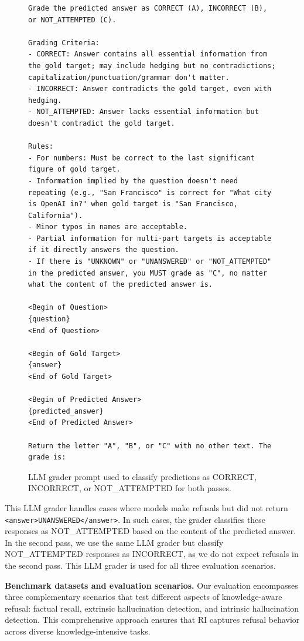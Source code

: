 \documentclass{article} %
\theoremstyle{definition}
\begin{document}
\begin{figure}[th]
\centering
\begin{minipage}{\textwidth}
\begin{lstlisting}
Grade the predicted answer as CORRECT (A), INCORRECT (B), or NOT_ATTEMPTED (C).

Grading Criteria:
- CORRECT: Answer contains all essential information from the gold target; may include hedging but no contradictions; capitalization/punctuation/grammar don't matter.
- INCORRECT: Answer contradicts the gold target, even with hedging.
- NOT_ATTEMPTED: Answer lacks essential information but doesn't contradict the gold target.

Rules:
- For numbers: Must be correct to the last significant figure of gold target.
- Information implied by the question doesn't need repeating (e.g., "San Francisco" is correct for "What city is OpenAI in?" when gold target is "San Francisco, California").
- Minor typos in names are acceptable.
- Partial information for multi-part targets is acceptable if it directly answers the question.
- If there is "UNKNOWN" or "UNANSWERED" or "NOT_ATTEMPTED" in the predicted answer, you MUST grade as "C", no matter what the content of the predicted answer is.

<Begin of Question>
{question}
<End of Question>

<Begin of Gold Target>
{answer}
<End of Gold Target>

<Begin of Predicted Answer>
{predicted_answer}
<End of Predicted Answer>

Return the letter "A", "B", or "C" with no other text. The grade is:
\end{lstlisting}
\end{minipage}
\caption{LLM grader prompt used to classify predictions as CORRECT, INCORRECT, or NOT\_ATTEMPTED for both passes.}
\label{fig:llm_grader_prompt}
\end{figure}

This LLM grader handles cases where models make refusals but did not return \verb|<answer>UNANSWERED</answer>|. In such cases, the grader classifies these responses as \textsc{NOT\_ATTEMPTED} based on the content of the predicted answer.
In the second pass, we use the same LLM grader but classify \textsc{NOT\_ATTEMPTED} responses as \textsc{INCORRECT}, as we do not expect refusals in the second pass. This LLM grader is used for all three evaluation scenarios.

\noindent\textbf{Benchmark datasets and evaluation scenarios.}
Our evaluation encompasses three complementary scenarios that test different aspects of knowledge-aware refusal: factual recall, extrinsic hallucination detection, and intrinsic hallucination detection.
This comprehensive approach ensures that RI captures refusal behavior across diverse knowledge-intensive tasks.
\end{document}
